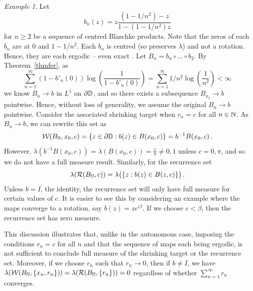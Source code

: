 \documentclass[11pt,reqno]{amsart}
\newcommand{\N}{{\Bbb N}}
\newcommand{\D}{{\Bbb D}}
\newcommand{\0}{\mathbf{0}}
\theoremstyle{remark}
\numberwithin{equation}{section}
\newtheorem{exmp}{Example}[section]
\theoremstyle{remark}
\newtheorem*{example}{Example}
\numberwithin{equation}{section}
\newcommand{\cR}{\mathcal{R}}
\begin{document}
\begin{example}
    Let $$b_n(z)=z\frac{(1-1/n^2)-z}{1-(1-1/n^2)z}$$ for $n \geq 2$ be a sequence of centred Blaschke products.  Note that the zeros of each $b_n$ are at  $0$ and $1-1/n^2$. Each $b_n$ is centred (so preserves $\lambda$) and not a rotation. Hence, they are each ergodic -- even exact \cite{DM}. Let $B_n=b_n \circ\dots\circ b_2$. By Theorem~\ref{thmfer}, as 
    $$
     \sum\limits_{n=1}^ \infty  (1-b'_n(0))\log(\frac{1}{1-b'_n(0)}) =  \sum\limits_{n=1}^ \infty  1/n^2 \log(\frac{1}{n^2}) 
     < \infty
    $$
    we know $B_n \to b$ in $L^1$ on $\partial \D$, and so there exists a subsequence $B_{n_j} \to b$ pointwise. Hence, without loss of generality, we assume the original $B_n \to b$ pointwise. Consider the associated shrinking target when $r_n=c$ for all $n \in \N$.
    As $B_n \to b$, we can rewrite this set as  
    $$\mathcal{W}(B_\N,x_0,c)= \{z \in \partial \D : b(z) \in B(x_0,c)\}=b^{-1}B(x_0,c) \, .$$
    However, $\lambda(b^{-1}B(x_0,c))=\lambda(B(x_0,c))=\frac{c}{\pi}\neq 0,1$ unless $c=0,\pi$, and so we do not have a full measure result. Similarly, for the recurrence set 
$$\lambda(\mathcal{R}(B_\N,c)) = \lambda\big(\{z: b(z) \in B(z,c)\}\big) \, .$$ Unless $b=I$, the identity, the recurrence set will only have full measure for certain values of $c$. It is easier to see this by considering an example where the maps converge to a rotation, say $b(z)=ze^{i\beta}$. If we choose $c< \beta$, then the recurrence set has zero measure. 

This discussion illustrates that, unlike in the autonomous case, imposing the conditions $r_n=c$ for all $n$ and that the sequence of maps each being ergodic, is not sufficient to conclude full measure of the shrinking target or the recurrence set. 
 Moreover, if we choose $r_n$ such that  $r_n \to 0$, then if $b \neq I$, we have $\lambda(\mathcal{W}(B_\N,\{x_n, r_n\}))=\lambda(\cR(B_\N,\{r_n\}))=0$ regardless of whether $\sum_{n=1}^\infty r_n$ converges.
\end{example}

\end{document}
